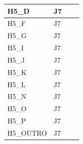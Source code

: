 \begin{longtable}{|l|l|l|l|}
H5\_D                           & J7                                                &                                                  &                                                  \\ \hline
H5\_F                           & J7                                                &                                                  &                                                  \\ \hline
H5\_G                           & J7                                                &                                                  &                                                  \\ \hline
H5\_I                           & J7                                                &                                                  &                                                  \\ \hline
H5\_J                           & J7                                                &                                                  &                                                  \\ \hline
H5\_K                           & J7                                                &                                                  &                                                  \\ \hline
H5\_L                           & J7                                                &                                                  &                                                  \\ \hline
H5\_N                           & J7                                                &                                                  &                                                  \\ \hline
H5\_O                           & J7                                                &                                                  &                                                  \\ \hline
H5\_P                           & J7                                                &                                                  &                                                  \\ \hline
H5\_OUTRO                           & J7                                                &                                                  &                                                  \\ \hline

\end{longtable}
